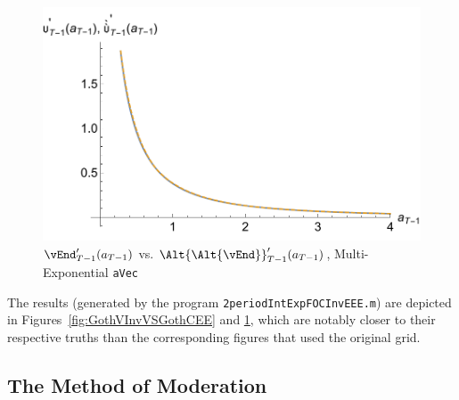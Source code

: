 \documentclass[titlepage, headings=optiontotocandhead]{\econtex}
\begin{document}
\hypertarget{GothVVSGothCInvEEE}{}
\begin{figure}
  \includegraphics{./Figures/GothVVSGothCInvEEE}
  \caption{$\vEnd_{T-1}^{\prime}({a}_{T-1})$ vs.
    $\Alt{\Alt{\vEnd}}_{T-1}^{\prime}({a}_{T-1})$, Multi-Exponential \texttt{aVec}}
  \label{fig:GothVVSGothCInvEE}
\end{figure}

The results (generated by the program \texttt{2periodIntExpFOCInvEEE.m})
are depicted in Figures~\ref{fig:GothVInvVSGothCEE} and
\ref{fig:GothVVSGothCInvEE}, which are notably closer to their
respective truths than the corresponding figures that used the original
grid.

\hypertarget{The-Method-of-Moderation}{}
\subsection{The Method of Moderation}
\end{document}
